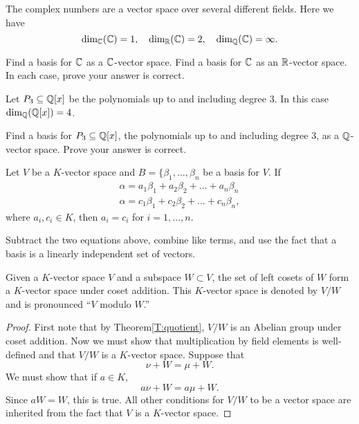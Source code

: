 \documentclass{ximera}
\begin{document}
\begin{example}
  The complex numbers are a vector space over several different
  fields. Here we have
  \[
  \dim_{\mathbb C}(\mathbb C) = 1, \quad \dim_{\mathbb R}(\mathbb C) = 2, \quad \dim_{\mathbb Q}(\mathbb C) =\infty.
  \]
\end{example}

\begin{exercise}
  Find a basis for $\mathbb C$ as a $\mathbb C$-vector space. Find a basis for $\mathbb C$
  as an $\mathbb R$-vector space. In each case, prove your answer is correct.
\end{exercise}



\begin{example}
  Let $P_3\subseteq \mathbb Q[x]$ be the polynomials up to and including degree
  $3$. In this case $\dim_{\mathbb Q}(\mathbb Q[x]) = 4$.
\end{example}

\begin{exercise}
  Find a basis for $P_3\subseteq \mathbb Q[x]$, the polynomials up to and
  including degree $3$, as a $\mathbb Q$-vector space. Prove your answer is
  correct.
\end{exercise}


\begin{theorem}
  Let $V$ be a $K$-vector space and $B = \{\beta_1,\dots,\beta_n$ be a
  basis for $V$. If
  \begin{align*}
  \alpha = a_1\beta_1 + a_2\beta_2 + \dots + a_n\beta_n\\
  \alpha = c_1\beta_1 + c_2\beta_2 + \dots + c_n\beta_n,
  \end{align*}
  where $a_i, c_i\in K$, then $a_i = c_i$ for $i =1,\dots, n$.
  \begin{sketch}
    Subtract the two equations above, combine like terms, and use the
    fact that a basis is a linearly independent set of vectors.
  \end{sketch}
\end{theorem}




\begin{theorem}
  Given a $K$-vector space $V$ and a subspace $W\subset V$, the set of
  left cosets of $W$ form a $K$-vector space under coset
  addition. This $K$-vector space is denoted by $V/W$ and is
  pronounced ``$V$ modulo $W$.''
  \begin{proof}
    First note that by Theorem\ref{T:quotient}, $V/W$ is an Abelian
    group under coset addition. Now we must show that multiplication
    by field elements is well-defined and that
    $V/W$ is a $K$-vector space. Suppose that
    \[
    \nu + W = \mu + W.
    \]
    We must show that if $a\in K$,
    \[
    a\nu + W = a\mu + W.
    \]
    Since $aW = W$, this is true. All other conditions for $V/W$ to be
    a vector space are inherited from the fact that $V$ is a $K$-vector
    space.
  \end{proof}
\end{theorem}
\end{document}
